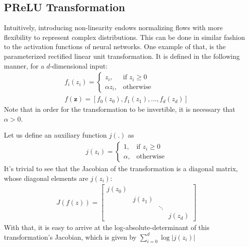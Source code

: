 \subsection{PReLU Transformation}
Intuitively, introducing non-linearity endows normalizing flows with more flexibility to
represent complex distributions. This can be done in similar fashion to the
activation functions of neural networks. One example of that, is the parameterized
rectified linear unit transformation. It is defined in the following manner, for
a $d$-dimensional input:
\begin{align}
f_i(z_i) =
    \begin{cases}
        z_i,              & \text{if } z_i\geq 0\\
        \alpha z_i,       & \text{otherwise}
    \end{cases} \\
f(\bm{z}) = [f_0(z_0), f_1(z_1), ..., f_d(z_d)]
\end{align}
Note that in order for the transformation to be invertible, it is necessary
that $\alpha > 0$.

Let us define an auxiliary function $j(.)$ as
\begin{align}
j(z_i) =
    \begin{cases}
       1 ,              & \text{if } z_i \geq 0\\
       \alpha ,       & \text{otherwise}
    \end{cases}
\end{align}
It's trivial to see that the Jacobian of the transformation is a diagonal
matrix, whose diagonal elements are $j(z_i)$:
\begin{align}
  J(f(z)) =
  \begin{bmatrix}
      j(z_0) & & & \\
      & j(z_1) & & \\
      & & \ddots & \\
      & & & j(z_d)
  \end{bmatrix}
\end{align}
With that, it is easy to arrive at the log-absolute-determinant of this transformation's
Jacobian, which is given by $\sum_{i=0}^d \log \Big| j(z_i) \Big|$

